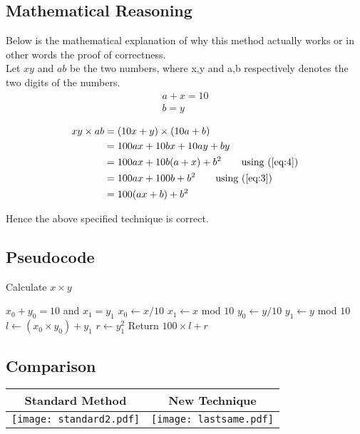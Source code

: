 \documentclass[]{article}
\begin{document}
\subsection{Mathematical Reasoning}
Below is the mathematical explanation of why this method actually works or in other words the proof of correctness.\\
Let $xy$ and $ab$ be the two numbers, where x,y and a,b respectively denotes the two digits of the numbers.
\begin{align}
a + x = 10 \label{eq:3}\\
b = y \label{eq:4}
\end{align}

\begin{align*} 
xy \times ab&=(10x+y) \times (10a+b) \\ 
&= 100ax + 10bx + 10ay + by\\
&= 100ax + 10b(a+x) + b^2 \tag*{using (\ref{eq:4})}\\
&= 100ax + 100b + b^2 \tag*{using (\ref{eq:3})}\\
&= 100(ax + b) + b^2
\end{align*}

Hence the above specified technique is correct.

\subsection{Pseudocode}
\begin{algorithm}
\caption{Calculate $x \times y$}
\begin{algorithmic} 
\REQUIRE $x_0 + y_0 = 10$ and $x_1 = y_1$
\STATE $x_0 \leftarrow x/10$
\STATE $x_1 \leftarrow x$ mod $10$
\STATE $y_0 \leftarrow y/10$
\STATE $y_1 \leftarrow y$ mod $10$
\STATE $l \leftarrow (x_0 \times y_0) + y_1$
\STATE $r \leftarrow y_1^2$
\STATE Return $100 \times l + r$
\end{algorithmic}
\end{algorithm}
\newpage
\subsection{Comparison}
\begin{table}[!h]
\begin{center}
\begin{tabular}{|c|c|}
\hline
Standard Method& New Technique\\
\hline
\texttt{[image: standard2.pdf]}&\texttt{[image: lastsame.pdf]}\\
\hline
\end{tabular}
\end{center}
\end{table}

{}

 
\end{document}
